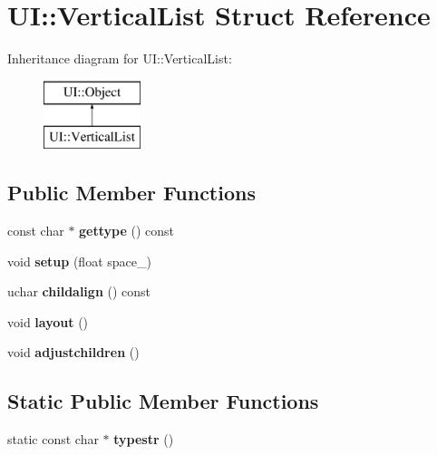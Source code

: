 \hypertarget{struct_u_i_1_1_vertical_list}{}\section{UI\+:\+:Vertical\+List Struct Reference}
\label{struct_u_i_1_1_vertical_list}
Inheritance diagram for UI\+:\+:Vertical\+List\+:\begin{figure}[H]
\begin{center}
\leavevmode
\includegraphics[height=2.000000cm]{struct_u_i_1_1_vertical_list}
\end{center}
\end{figure}
\subsection*{Public Member Functions}
\begin{DoxyCompactItemize}
\item 
\mbox{\label{struct_u_i_1_1_vertical_list_a354260f5d2e0d248f99af9f1017a596e}} 
const char $\ast$ {\bfseries gettype} () const
\item 
\mbox{\label{struct_u_i_1_1_vertical_list_adc9768fdb2cd70cd8d76a8ecddf29692}} 
void {\bfseries setup} (float space\+\_)
\item 
\mbox{\label{struct_u_i_1_1_vertical_list_a472e476e97323ee5fd112ca5a44062f2}} 
uchar {\bfseries childalign} () const
\item 
\mbox{\label{struct_u_i_1_1_vertical_list_ab11730d7c156e101baa3ec709bbea97c}} 
void {\bfseries layout} ()
\item 
\mbox{\label{struct_u_i_1_1_vertical_list_a9be76b471cd83d85ad084f919b3190fb}} 
void {\bfseries adjustchildren} ()
\end{DoxyCompactItemize}
\subsection*{Static Public Member Functions}
\begin{DoxyCompactItemize}
\item 
\mbox{\label{struct_u_i_1_1_vertical_list_ab108d3546f89dc0f0a4fbaf93c499d26}} 
static const char $\ast$ {\bfseries typestr} ()
\end{DoxyCompactItemize}
